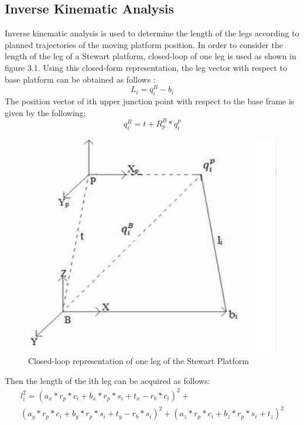 \subsection{Inverse Kinematic Analysis}
Inverse kinematic analysis is used to determine the length of the legs according to planned trajectories of the moving platform position. In order to consider the length of the leg of a Stewart platform, closed-loop of one leg is used as shown in figure 3.1. Using this closed-form representation, the leg
vector with respect to base platform can be obtained as follows \cite{csumnu2017simulation}:
\begin{equation}
\label{eqn}
L_{i} = q_{i}^{B} - b_{i}
\end{equation}
The position vector of ith upper junction point with respect to the base frame is given by the following;
\begin{equation}
\label{eqn}
q_{i}^{B} = t + R_{p}^{B} * q_{i}^{p}
\end{equation}
\begin{center}
	\begin{figure}[H]
	\centering
	\includegraphics[width=0.6\linewidth]{Figures/Fig12}
	\caption[Closed-loop representation]{Closed-loop representation of one leg of the Stewart Platform \cite{csumnu2017simulation}}
	\end{figure}
\end{center}
Then the length of the ith leg can be acquired as follows:
\newpage
\begin{multline}
\label{eqn}
l_{i}^2 = (a_{x} * r_{p} * c_{i} + b_{x}*r_{p}*s_{i}
+ t_{x}-r_{b}*c_{i})^2 + \\(a_{y}*r_{p}*c_{i} + b_{y}*r_{p}*s_{i} + t_{y}-r_{b}*s_{i})^2+ (a_{z}*r_{p}*c_{i}+b_{z}*r_{p}*s_{i}+t_{z})^2
\end{multline}

